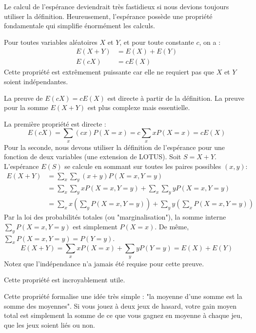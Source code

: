 Le calcul de l'espérance deviendrait très fastidieux si nous devions toujours utiliser la définition. Heureusement, l'espérance possède une propriété fondamentale qui simplifie énormément les calculs.

\begin{theorembox}
Pour toutes variables aléatoires $X$ et $Y$, et pour toute constante $c$, on a :
\begin{align*}
E(X+Y) &= E(X) + E(Y) \\
E(cX) &= cE(X)
\end{align*}
Cette propriété est extrêmement puissante car elle ne requiert pas que $X$ et $Y$ soient indépendantes.
\end{theorembox}

La preuve de $E(cX) = cE(X)$ est directe à partir de la définition. La preuve pour la somme $E(X+Y)$ est plus complexe mais essentielle.

\begin{proofbox}
La première propriété est directe :
$$ E(cX) = \sum_x (cx) P(X=x) = c \sum_x x P(X=x) = cE(X) $$
Pour la seconde, nous devons utiliser la définition de l'espérance pour une fonction de deux variables (une extension de LOTUS). Soit $S = X+Y$. L'espérance $E(S)$ se calcule en sommant sur toutes les paires possibles $(x, y)$:
\begin{align*}
E(X+Y) &= \sum_x \sum_y (x+y) P(X=x, Y=y) \\
&= \sum_x \sum_y x P(X=x, Y=y) + \sum_x \sum_y y P(X=x, Y=y) \\
&= \sum_x x \left( \sum_y P(X=x, Y=y) \right) + \sum_y y \left( \sum_x P(X=x, Y=y) \right)
\end{align*}
Par la loi des probabilités totales (ou "marginalisation"), la somme interne $\sum_y P(X=x, Y=y)$ est simplement $P(X=x)$. De même, $\sum_x P(X=x, Y=y) = P(Y=y)$.
$$ E(X+Y) = \sum_x x P(X=x) + \sum_y y P(Y=y) = E(X) + E(Y) $$
Notez que l'indépendance n'a jamais été requise pour cette preuve.
\end{proofbox}

Cette propriété est incroyablement utile.

\begin{intuitionbox}
Cette propriété formalise une idée très simple : "la moyenne d'une somme est la somme des moyennes". Si vous jouez à deux jeux de hasard, votre gain moyen total est simplement la somme de ce que vous gagnez en moyenne à chaque jeu, que les jeux soient liés ou non.
\end{intuitionbox}

